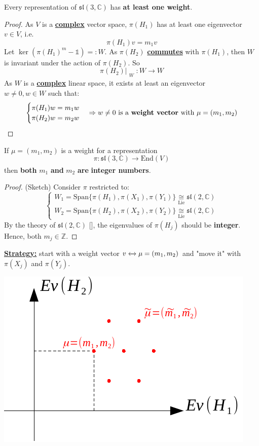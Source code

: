 \documentclass[../main.tex]{subfiles}
\begin{document}
\begin{proposition}
Every representation of $\mathfrak{sl}(3,\mathbb{C})$ has \textbf{at least one weight}.
\end{proposition}
\begin{proof}
As $V$ is a \underline{\textbf{complex}} vector space, $\pi(H_1)$ has at least one eigenvector $v\in V$, i.e. \[
\pi(H_1)v=m_1v\]
Let $\ker(\pi(H_1)^m-\mathbb{1})=:W$. As $\pi(H_2)$ \underline{\textbf{commutes}} with $\pi(H_1)$, then $W$ is invariant under the action of $\pi(H_2)$. So
\[
\pi(H_2)\Bigr|_{\substack{W}}:W\xrightarrow[]{}W
\]
As $W$ is a \underline{\textbf{complex}} linear space, it exists at least an eigenvector\\
$w\neq0,w\in W$ such that:
\[
\begin{cases}
\pi(H_1)w=m_1w\\
\pi(H_2)w=m_2w
\end{cases}
\Rightarrow w\neq0 \text{ is a \textbf{weight vector} with } \mu=(m_1,m_2)
\]
\end{proof}
\begin{proposition}
If $\mu=(m_1,m_2)$ is a weight for a representation
\[
\pi:\mathfrak{sl}(3,\mathbb{C})\xrightarrow[]{}\text{End}(V)
\]
then \textbf{both} $m_1$ \textbf{and} $m_2$ \textbf{are} \textbf{integer numbers}.
\end{proposition}
\begin{proof} (Sketch) 
Consider $\pi$ restricted to:
\[
\begin{cases}
W_1=\text{Span}\{\pi(H_1),\pi(X_1),\pi(Y_1)\}\underset{\textrm{Lie}}{\cong}\mathfrak{sl}(2,\mathbb{C})\\
W_2=\text{Span}\{\pi(H_2),\pi(X_2),\pi(Y_2)\}\underset{\textrm{Lie}}{\cong}\mathfrak{sl}(2,\mathbb{C})
\end{cases}
\]
By the theory of $\mathfrak{sl}(2,\mathbb{C})$ [], the eigenvalues of $\pi(H_j)$ should be \textbf{integer}. Hence, both $m_j\in\mathbb{Z}$.
\end{proof}
\underline{\textbf{Strategy:}} start with a weight vector $v\xleftrightarrow[]{}\mu=(m_1,m_2)$ and "move it"
with $\pi(X_j)$ and $\pi(Y_j)$.
\begin{marginfigure}
    \includegraphics{images/weight_proof_sketch.pdf}
    \caption*{}
\end{marginfigure}
\end{document}
